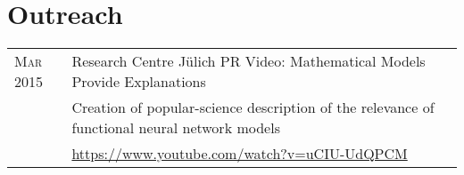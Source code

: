 \section{Outreach}
\begin{longtable}{>{\hfill}p{3.15cm}|p{10.4cm}}
  \textsc{Mar} 2015 & Research Centre J\"ulich PR Video: Mathematical Models Provide Explanations \\
                    & \footnotesize Creation of popular-science description of the relevance of functional neural network models \\
                    & \footnotesize \href{https://www.youtube.com/watch?v=uCIU-UdQPCM}{https://www.youtube.com/watch?v=uCIU-UdQPCM}
\end{longtable}